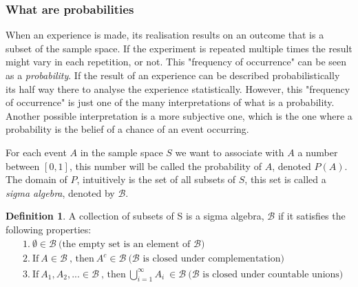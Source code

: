 \documentclass[
  oneside,
  11pt, a4paper,
  footinclude=true,
  headinclude=true,
  cleardoublepage=empty
]{scrbook}
\theoremstyle{definition}
\newtheorem{definition}{Definition}[section]
\theoremstyle{definition}
\begin{document}
            \subsubsection{What are probabilities}
            
                When an experience is made, its realisation results on an outcome that is a subset of the sample space. If the experiment is repeated multiple times the result might vary in each repetition, or not. This "frequency of occurrence" can be seen as a \emph{probability}. If the result of an experience can be described probabilistically its half way there to analyse the experience statistically. However, this "frequency of occurrence" is just one of the many interpretations of what is a probability. Another possible interpretation is a more subjective one, which is the one where a probability is the belief of a chance of an event occurring.
                
                For each event $A$ in the sample space $S$ we want to associate with $A$ a number between $[0, 1]$, this number will be called the probability of $A$, denoted $P(A)$. The domain of $P$, intuitively is the set of all subsets of $S$, this set is called a \emph{sigma algebra}, denoted by $\mathscr{B}$.%
                
                \begin{definition}{A collection of subsets of S is a sigma algebra, $\mathscr{B}$ if it satisfies the following properties:}
                \begin{align*}
                    &1.\ \emptyset \in \mathscr{B}\ \text{(the empty set is an element of $\mathscr{B}$)}\\
                    &2.\ \text{If}\ A \in \mathscr{B}\ \text{, then}\ A^c \in \mathscr{B}\  \text{($\mathscr{B}$ is closed under complementation)}\\
                    &3.\ \text{If}\ A_1, A_2, ... \in \mathscr{B}\ \text{, then}\ \bigcup_{i=1}^{\infty} A_i \ \in \mathscr{B}\ \text{($\mathscr{B}$ is closed under countable unions)}
                \end{align*}{}
                \end{definition}{}
                
\end{document}
